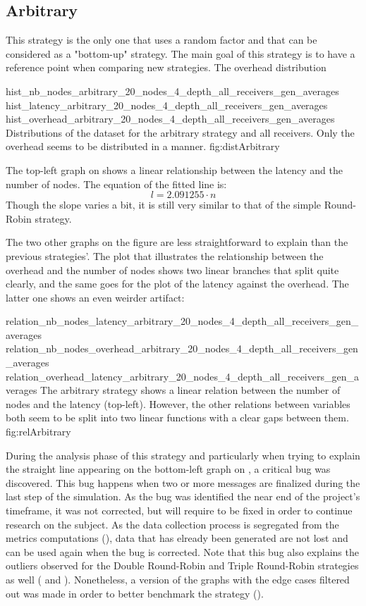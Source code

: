 \FloatBarrier
\subsection{Arbitrary}
\label{ssec:arbitrary}
This strategy is the only one that uses a random factor and that can be
considered as a "bottom-up" strategy. The main goal of this strategy is to
have a reference point when comparing new strategies.
The overhead distribution 

\triplefigure
    {hist_nb_nodes_arbitrary_20_nodes_4_depth_all_receivers_gen_averages}
    {hist_latency_arbitrary_20_nodes_4_depth_all_receivers_gen_averages}
    {hist_overhead_arbitrary_20_nodes_4_depth_all_receivers_gen_averages}
    {Distributions of the dataset for the arbitrary strategy and all
    receivers. Only the overhead seems to be distributed in a  manner. }
    {fig:distArbitrary}

The top-left graph on  shows a linear relationship
between the latency and the number of nodes. The equation of the fitted line is:
\[l = 2.091255 \cdot n\]
Though the slope varies a bit, it is still very similar to that of the simple
Round-Robin strategy.

The two other graphs on the figure are less straightforward to explain than the
previous strategies'. The plot that illustrates the relationship between the
overhead and the number of nodes shows two linear branches that split quite
clearly, and the same goes for the plot of the latency against the overhead.
The latter one shows an even weirder artifact: 

\triplefigure
    {relation_nb_nodes_latency_arbitrary_20_nodes_4_depth_all_receivers_gen_averages}
    {relation_nb_nodes_overhead_arbitrary_20_nodes_4_depth_all_receivers_gen_averages}
    {relation_overhead_latency_arbitrary_20_nodes_4_depth_all_receivers_gen_averages}
    {The arbitrary strategy shows a linear relation between the number of
    nodes and the latency (top-left). However, the other relations between
    variables both seem to be split into two linear functions with a clear gaps
    between them.}
    {fig:relArbitrary}

During the analysis phase of this strategy and particularly when trying to
explain the straight line appearing on the bottom-left graph on
, a critical bug was discovered. This bug happens when two
or more messages are finalized during the last step of the simulation. As the
bug was identified the near end of the project's timeframe, it was not corrected,
but will require to be fixed in order to continue research on the subject. As
the data collection process is segregated from the metrics computations
(), data that has elready been generated are not
lost and can be used again when the bug is corrected. Note that this bug also
explains the outliers observed for the Double Round-Robin and Triple Round-Robin
strategies as well ( and ).
Nonetheless, a version of the graphs with the edge cases filtered out was made
in order to better benchmark the strategy ().

